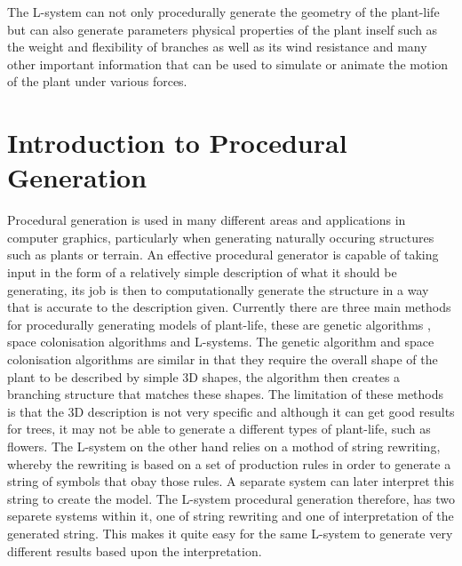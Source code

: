 The L-system can not only procedurally generate the geometry of the plant-life but can also generate parameters physical properties of the plant inself such as the weight and flexibility of branches as well as its wind resistance and many other important information that can be used to simulate or animate the motion of the plant under various forces.  

\section{Introduction to Procedural Generation}

Procedural generation is used in many different areas and applications in computer graphics, particularly when generating naturally occuring structures such as plants or terrain. An effective procedural generator is capable of taking input in the form of a relatively simple description of what it should be generating, its job is then to computationally generate the structure in a way that is accurate to the description given. Currently there are three main methods for procedurally generating models of plant-life, these are genetic algorithms \cite{haubenwallner2017shapegenetics}, space colonisation algorithms\cite{juuso2017procedural} and L-systems. The genetic algorithm and space colonisation algorithms are similar in that they require the overall shape of the plant to be described by simple 3D shapes, the algorithm then creates a branching structure that matches these shapes. The limitation of these methods is that the 3D description is not very specific and although it can get good results for trees, it may not be able to generate a different types of plant-life, such as flowers. The L-system on the other hand relies on a mothod of string rewriting, whereby the rewriting is based on a set of production rules in order to generate a string of symbols that obay those rules. A separate system can later interpret this string to create the model. The L-system procedural generation therefore, has two separete systems within it, one of string rewriting and one of interpretation of the generated string. This makes it quite easy for the same L-system to generate very different results based upon the interpretation.\\

